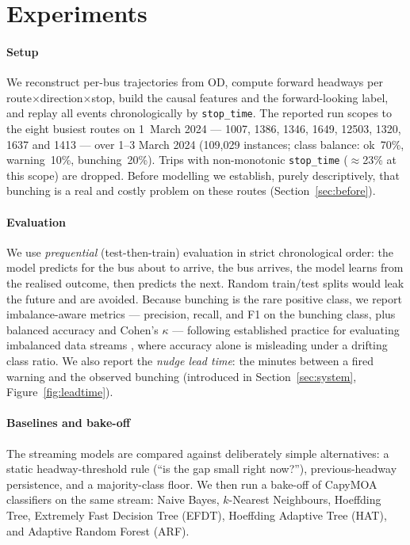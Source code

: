 \documentclass[final,5p,times,twocolumn,authoryear]{elsarticle}
\begin{document}
\section{Experiments}
\label{sec:experiments}

\paragraph{Setup}
We reconstruct per-bus trajectories from OD, compute forward headways per
route$\times$direction$\times$stop, build the causal features and the forward-looking label,
and replay all events chronologically by \texttt{stop\_time}. The reported run scopes to the
eight busiest routes on 1~March 2024 --- 1007, 1386, 1346, 1649, 12503, 1320, 1637 and 1413 ---
over 1--3 March 2024 (109{,}029 instances; class balance: ok~70\%, warning~10\%, bunching~20\%).
Trips with non-monotonic \texttt{stop\_time} ($\approx$23\% at this scope) are dropped.
Before modelling we establish, purely descriptively, that bunching is a real and costly problem
on these routes (Section~\ref{sec:before}).

\paragraph{Evaluation}
We use \emph{prequential} (test-then-train) evaluation in strict chronological order: the model
predicts for the bus about to arrive, the bus arrives, the model learns from the realised
outcome, then predicts the next. Random train/test splits would leak the future and are avoided.
Because bunching is the rare positive class, we report imbalance-aware metrics --- precision,
recall, and F1 on the bunching class, plus balanced accuracy and Cohen's $\kappa$ --- following
established practice for evaluating imbalanced data streams \citep{Aguiar2024}, where accuracy
alone is misleading under a drifting class ratio. We also report the
\emph{nudge lead time}: the minutes between a fired warning and the observed bunching
(introduced in Section~\ref{sec:system}, Figure~\ref{fig:leadtime}).

\paragraph{Baselines and bake-off}
The streaming models are compared against deliberately simple alternatives: a static
headway-threshold rule (``is the gap small right now?''), previous-headway persistence, and a
majority-class floor. We then run a bake-off of CapyMOA classifiers on the same stream:
Naive Bayes, $k$-Nearest Neighbours, Hoeffding Tree, Extremely Fast Decision Tree (EFDT),
Hoeffding Adaptive Tree (HAT), and Adaptive Random Forest (ARF).
\end{document}
